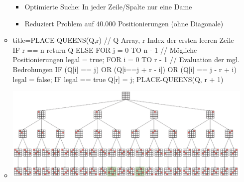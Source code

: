 \documentclass[
    12pt,
    a4paper,
    ngerman,
    color=3b,%
    marginpar=false,
    colorback=false,
    leqno,
]{tudaexercise}
\begin{document}
\begin{itemize}
\begin{itemize}
\begin{minipage}{0.6\textwidth}
\begin{itemize}
                            \item Optimierte Suche: In jeder Zeile/Spalte nur eine Dame
                            \item Reduziert Problem auf 40.000 Positionierungen (ohne Diagonale)
                        \end{itemize}
                    \end{minipage}
                \item[]
                    \begin{ccode}[autogobble]{title={PLACE-QUEENS(Q,r) // Q Array, r Index der ersten leeren Zeile}}
                    IF r == n
                        return Q
                    ELSE
                        FOR j = 0 TO n - 1 // Mögliche Positionierungen
                            legal = true;
                            FOR i = 0 TO r - 1  // Evaluation der mgl. Bedrohungen
                                IF (Q[i] == j) OR (Q[i==j + r - i]) OR (Q[i] == j - r + i)
                                    legal = false;
                            IF legal == true
                                Q[r] = j;
                                PLACE-QUEENS(Q, r + 1)
                    \end{ccode}
                        \item[] \includegraphics[width=16cm]{pictures/damenSuchbaum.PNG}
            \end{itemize}

    \end{itemize}

\pagebreak
\end{document}
